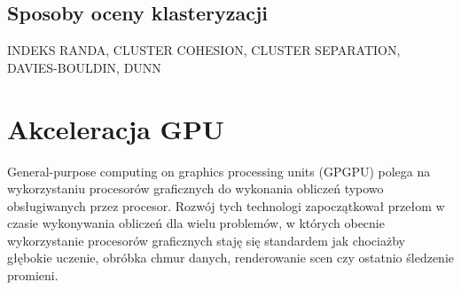\subsection{Sposoby oceny klasteryzacji}
INDEKS RANDA, CLUSTER COHESION, CLUSTER SEPARATION, DAVIES-BOULDIN, DUNN

\section{Akceleracja GPU}
\label{sec:akceleracja}
General-purpose computing on graphics processing units (GPGPU) polega na wykorzystaniu procesorów graficznych do wykonania obliczeń typowo obsługiwanych przez procesor. Rozwój tych technologi zapoczątkował przełom w czasie wykonywania obliczeń dla wielu problemów, w których obecnie wykorzystanie procesorów graficznych staję się standardem jak chociażby głębokie uczenie, obróbka chmur danych, renderowanie scen czy ostatnio śledzenie promieni.

